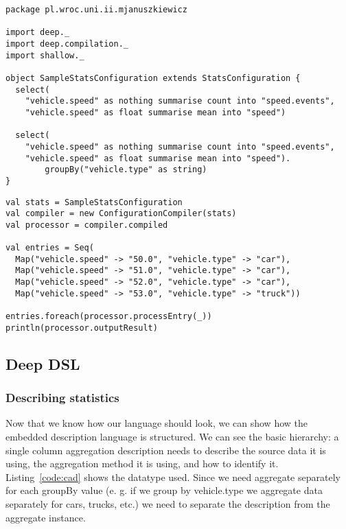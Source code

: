 \begin{lstlisting}[caption=Defined statistics, label=code:stats_sample]
package pl.wroc.uni.ii.mjanuszkiewicz

import deep._
import deep.compilation._
import shallow._

object SampleStatsConfiguration extends StatsConfiguration {
  select(
    "vehicle.speed" as nothing summarise count into "speed.events",
    "vehicle.speed" as float summarise mean into "speed")

  select(
    "vehicle.speed" as nothing summarise count into "speed.events",
    "vehicle.speed" as float summarise mean into "speed").
		groupBy("vehicle.type" as string)
}
\end{lstlisting}

\begin{lstlisting}[caption=Using statistics, label=code:stats_use]
val stats = SampleStatsConfiguration
val compiler = new ConfigurationCompiler(stats)
val processor = compiler.compiled

val entries = Seq(
  Map("vehicle.speed" -> "50.0", "vehicle.type" -> "car"),
  Map("vehicle.speed" -> "51.0", "vehicle.type" -> "car"),
  Map("vehicle.speed" -> "52.0", "vehicle.type" -> "car"),
  Map("vehicle.speed" -> "53.0", "vehicle.type" -> "truck"))

entries.foreach(processor.processEntry(_))
println(processor.outputResult)
\end{lstlisting}

\subsection{Deep DSL}

\subsubsection{Describing statistics}
Now that we know how our language should look, we can show how the embedded description language is structured. We can see the basic hierarchy: a single column aggregation description needs to describe the source data it is using, the aggregation method it is using, and how to identify it. Listing~\ref{code:cad} shows the datatype used. Since we need aggregate separately for each groupBy value (e. g. if we group by vehicle.type we aggregate data separately for cars, trucks, etc.) we need to separate the description from the aggregate instance.

